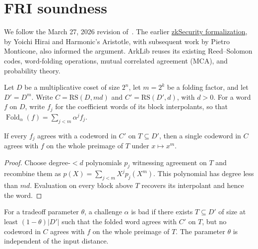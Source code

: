 
\section{FRI soundness}

We follow the March 27, 2026 revision of~\cite{GMW25}. The earlier
\href{https://github.com/zksecurity/simple-rbr-fri}{zkSecurity formalization}, by
Yoichi Hirai and Harmonic's Aristotle, with subsequent work by Pietro Monticone,
also informed the argument. ArkLib reuses its existing Reed--Solomon codes,
word-folding operations, mutual correlated agreement (MCA), and probability theory.

Let $D$ be a multiplicative coset of size $2^n$, let $m=2^k$ be a folding factor,
and let $D'=D^m$. Write $C=\mathrm{RS}(D,md)$ and
$C'=\mathrm{RS}(D',d)$, with $d>0$. For a word $f$ on $D$, write $f_j$ for the
coefficient words of its block interpolants, so that
$\operatorname{Fold}_\alpha(f)=\sum_{j<m}\alpha^j f_j$.

\begin{lemma}\label{lem:fri-coefficient-lift}
\leanok
If every $f_j$ agrees with a codeword in $C'$ on $T\subseteq D'$, then a single
codeword in $C$ agrees with $f$ on the whole preimage of $T$ under $x\mapsto x^m$.
\end{lemma}
\begin{proof}
\leanok
Choose degree-$<d$ polynomials $p_j$ witnessing agreement on $T$ and recombine them
as $p(X)=\sum_{j<m}X^j p_j(X^m)$. This polynomial has degree less than $md$.
Evaluation on every block above $T$ recovers its interpolant and hence the word.
\end{proof}

\begin{definition}\label{def:fri-folding-failure}
\leanok
For a tradeoff parameter $\theta$, a challenge $\alpha$ is bad if there exists
$T\subseteq D'$ of size at least $(1-\theta)|D'|$ such that the folded word agrees
with $C'$ on $T$, but no codeword in $C$ agrees with $f$ on the whole preimage of $T$.
The parameter $\theta$ is independent of the input distance.
\end{definition}

